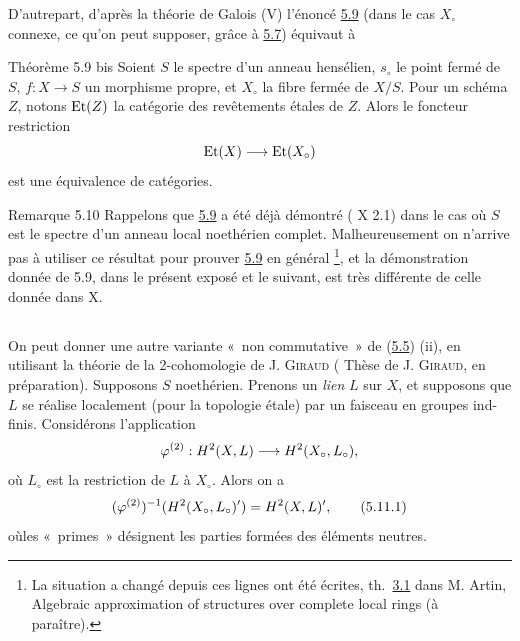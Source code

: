 \documentclass[10pt]{../fichiers-configuration-latex/smfart}
\begin{document}
D'autre\pageoriginale part, d'après la théorie de Galois (\SGA V)
l'énoncé \hyperref[XII.thm5.9]{5.9} (dans le cas $X_{\circ}$ connexe, ce qu'on peut supposer,
grâce à \hyperref[XII.cor5.7]{5.7}) équivaut à

\begin{enonce*}{Théorème 5.9 bis}
Soient $S$ le spectre d'un anneau hensélien, $s_{\circ}$ le point
fermé de $S$, $f:X\rightarrow S$ un morphisme propre, et $X_{\circ}$
la fibre fermée de $X/S$. Pour un schéma $Z$, notons $\operatorname{Et}(Z)$ la
catégorie des revêtements étales de $Z$. Alors le foncteur restriction
$$
\operatorname{Et}(X)\longrightarrow \operatorname{Et}(X_{\circ})
$$
est une équivalence de catégories.
\end{enonce*}

\begin{enonce*}[remark]{Remarque 5.10}
Rappelons que \hyperref[XII.thm5.9]{5.9} a été déjà démontré ( X 2.1) dans le cas où
$S$ est le spectre d'un anneau local noethérien
complet. Malheureusement on n'arrive pas à utiliser ce résultat pour
prouver \hyperref[XII.thm5.9]{5.9} en général \footnote[1]{La situation a changé depuis ces
  lignes ont été écrites, \cf th.~\hyperref[XII.prop3.1]{3.1} dans M. Artin, Algebraic
  approximation of structures over complete local rings (à
  paraître).}, et la démonstration donnée de 5.9, dans le présent
exposé et le suivant, est très différente de celle donnée dans  X.
\end{enonce*}

\setcounter{subsection}{10}
\subsection{}
On peut donner une autre variante « non commutative »  de (\hyperref[XII.cor5.5]{5.5})
(ii), en utilisant la théorie de la 2-cohomologie de J. \textsc{Giraud} (\cf
Thèse de J. \textsc{Giraud}, en préparation). Supposons $S$ noethérien. Prenons
un \emph{lien} $L$ sur $X$, et supposons que $L$ se réalise localement
(pour la topologie étale) par un faisceau en groupes
ind-finis. Considérons l'application
$$
\varphi^{(2)}:H^2(X,L)\longrightarrow H^2(X_{\circ},L_{\circ}){},
$$
où $L_{\circ}$ est la restriction de $L$ à $X_{\circ}$. Alors on a
\begin{equation*}
(\varphi^{(2)})^{-1}(H^2(X_{\circ},L_{\circ})')=H^2(X,L)'{},\tag{5.11.1}
\end{equation*}
où\pageoriginale les « primes »  désignent les parties formées des
éléments neutres.
\end{document}

